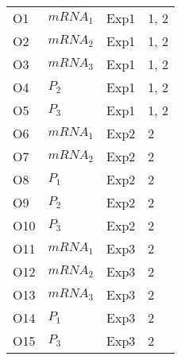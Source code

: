 

\begin{center}
\label{3_node_objective}
\begin{scriptsize}
\begin{supertabular}{|p{2cm}|p{3cm}|p{3cm}|p{3cm}|}  
\hline											
O1 &  $mRNA_{1}$ & Exp1 & 1, 2 \\
O2 &  $mRNA_{2}$ & Exp1 & 1, 2 \\
O3 &  $mRNA_{3}$ & Exp1 & 1, 2 \\
O4 &  $P_{2}$ & Exp1 & 1, 2 \\
O5 &  $P_{3}$ & Exp1 & 1, 2 \\
O6 &  $mRNA_{1}$ & Exp2 & 2 \\
O7 &  $mRNA_{2}$ & Exp2 & 2 \\
O8 &  $P_{1}$ & Exp2 & 2 \\
O9 &  $P_{2}$ & Exp2 & 2 \\
O10 &  $P_{3}$ & Exp2 & 2 \\
O11 &  $mRNA_{1}$ & Exp3 & 2 \\
O12 &  $mRNA_{2}$ & Exp3 & 2 \\
O13 &  $mRNA_{3}$ & Exp3 & 2 \\
O14 &  $P_{1}$ & Exp3 & 2 \\
O15 &  $P_{3}$ & Exp3 & 2 \\
\hline
\end{supertabular}
\end{scriptsize}
\end{center}
%
